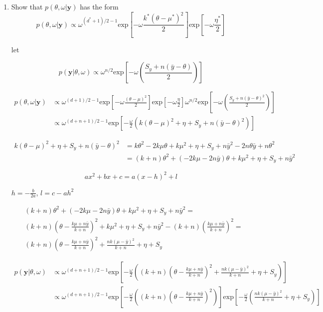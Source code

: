 \documentclass[10pt]{article}
\newcommand{\by}{\mathbf{y}}
\begin{document}
\begin{enumerate}[label=(\Alph*)]
      \item Show that $p(\theta, \omega | \by)$ has the form
        $$p(\theta, \omega| \by) \propto \omega^{(d^* + 1)/2 -1} \text{exp} \left [ -\omega \frac{k^* ( \theta - \mu^*)^2}{2}\right] \text{exp} \left [ -\omega \frac{\eta^*}{2}\right] $$

        let

        $$p(\by| \theta, \omega) \propto \omega^{n/2} \text{exp} \left [ -\omega \left ( \frac{S_y + n (\bar{y} - \theta)}{2}\right) \right ]$$

        \begin{align*}
          p(\theta, \omega | \by) &\propto \omega^{(d+1)/2-1} \text{exp}\left [ -\omega \frac{(\theta - \mu)^2}{2}\right] \text{exp}\left [ -\omega \frac{\eta}{2}\right] \omega^{n/2} \text{exp}\left[ -\omega \left( \frac{S_y + n (\bar{y} - \theta)^2}{2}\right)\right] \\
          &\propto \omega^{(d+n+1)/2 - 1}\text{exp}\left[ -\frac{\omega}{2} \left( k(\theta - \mu)^2 + \eta + S_y + n(\bar{y} - \theta)^2\right)\right]
        \end{align*}

        \begin{align*}
          k(\theta - \mu)^2 + \eta + S_y + n(\bar{y} - \theta)^2 &= k \theta^2 - 2 k \mu \theta + k \mu^2 + \eta + S_y + n\bar{y}^2 - 2n \theta \bar{y} + n \theta^2 \\
          &= (k+n) \theta^2 + (-2k\mu - 2n\bar{y}) \theta + k \mu^2 + \eta + S_y + n \bar{y}^2
        \end{align*}

        $$ax^2 + bx + c = a(x - h)^2 + l$$

        $h = -\frac{b}{2a}$, $l = c - a h^2$

        \begin{align*}
          & (k+n) \theta^2 + (-2k\mu - 2n\bar{y}) \theta + k \mu^2 + \eta + S_y + n \bar{y}^2 = \\
          &(k+n) \left( \theta - \frac{k\mu + n\bar{y}}{k+n}\right)^2 + k \mu^2 + \eta + S_y + n \bar{y}^2 - (k+n)\left( \frac{k\mu + n \bar{y}}{k+n}\right)^2 = \\
          & (k+n) \left( \theta - \frac{k\mu + n\bar{y}}{k+n}\right)^2 + \frac{nk(\mu - \bar{y})^2}{k+n} + \eta + S_y
        \end{align*}

        \begin{align*}
          p(\by| \theta, \omega) &\propto \omega^{(d+n+1)/2-1} \text{exp}\left[  -\frac{\omega}{2} \left( (k+n) \left( \theta - \frac{k\mu + n\bar{y}}{k+n}\right)^2 + \frac{nk(\mu - \bar{y})^2}{k+n} + \eta + S_y\right) \right] \\
          & \propto \omega^{(d+n+1)/2-1} \text{exp}\left[  -\frac{\omega}{2} \left( (k+n) \left( \theta - \frac{k\mu + n\bar{y}}{k+n}\right)^2 \right) \right] \text{exp}\left[ - \frac{\omega}{2}\left( \frac{nk(\mu - \bar{y})^2}{k+n} + \eta + S_y\right) \right]
        \end{align*}


\end{enumerate}
\end{document}
